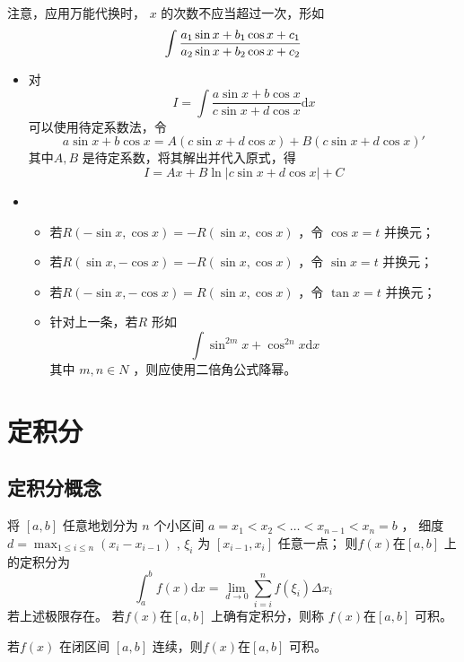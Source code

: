 注意，应用万能代换时， $ x $ 的次数不应当超过一次，形如$$
    \int \displaystyle\frac{a_1\sin x + b_1 \cos x + c_1}{a_2\sin x + b_2 \cos x + c_2}
$$ 


\begin{itemize}
    \item 对 $$
        I = \int \frac{a\sin x + b\cos x}{c\sin x+d\cos x}\mathrm{d}x
    $$ 
    可以使用待定系数法，令$$
        a\sin x+b\cos x = A(c\sin x+d\cos x)+B(c\sin x+ d\cos x)'
    $$ 
    其中$ A,B $ 是待定系数，将其解出并代入原式，得$$
        I=Ax+B\ln|c\sin x+d\cos x|+C
    $$ 
    \item \begin{itemize}
        \item 若$ R(-\sin x, \cos x)=-R(\sin x, \cos x) $ ，令 $ \cos x = t $ 并换元；
        \item 若$ R(\sin x, -\cos x)=-R(\sin x, \cos x) $ ，令 $ \sin x = t $ 并换元；
        \item 若$ R(-\sin x, -\cos x)=R(\sin x, \cos x) $ ，令 $ \tan x = t $ 并换元；
        \item 针对上一条，若$ R $ 形如$$
            \int \sin^{2m} x + \cos^{2n} x \mathrm{d}x
        $$ 其中 $ m,n\in N $ ，则应使用二倍角公式降幂。
    \end{itemize}
\end{itemize}


\section{定积分}

\subsection{定积分概念}

\begin{Def}[]

    将 $ [a,b] $ 任意地划分为 $ n $ 个小区间 $ a = x_1<x_2<\dots<x_{n-1}<x_n=b $ ，
    细度 $ d=\max_{1\leq i \leq n}(x_i-x_{i-1}) $ , $ \xi_i $ 为 $ [x_{i-1},x_i] $ 任意一点；
    则$ f(x) $在$ [a,b] $ 上的定积分为$$
        \int_a^b f(x)\mathrm{d}x = {\displaystyle\lim_{d\rightarrow 0}}
        \sum_{i=i}^nf(\xi_i)\Delta x_i
    $$ 
    若上述极限存在。
    若$ f(x) $在$ [a,b] $ 上确有定积分，则称 $ f(x) $在$ [a,b] $ 可积。
\end{Def}

\begin{Theo}[连续必可积]

    若$ f(x) $ 在闭区间 $ [a,b] $ 连续，则$ f(x) $在$ [a,b] $ 可积。
\end{Theo}

